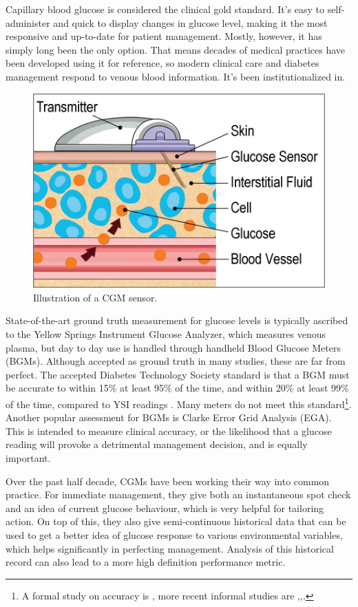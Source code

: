 Capillary blood glucose is considered the clinical gold standard. It’s easy to self-administer and quick to display changes in glucose level, making it the most responsive and up-to-date for patient management. Mostly, however, it has simply long been the only option. That means decades of medical practices have been developed using it for reference, so modern clinical care and diabetes management respond to venous blood information. It’s been institutionalized in. 

\begin{figure}[ht]
\centering\includegraphics[width=0.5\linewidth]{images/cgm.png}
\caption{Illustration of a CGM sensor.}
\label{fig:cgmsensor}
\end{figure}

State-of-the-art ground truth measurement for glucose levels is typically ascribed to the Yellow Springs Instrument Glucose Analyzer, which measures venous plasma, but day to day use is handled through handheld Blood Glucose Meters (BGMs). Although accepted as ground truth in many studies, these are far from perfect. The accepted Diabetes Technology Society standard is that a BGM must be accurate to within 15\% at least 95\% of the time, and within 20\% at least 99\% of the time, compared to YSI readings \cite{noauthor_fda_2016}. Many meters do not meet this standard\footnote{A formal study on accuracy is \cite{clarke_evaluating_1987}, more recent informal studies are \cite{scheiner_2016_nodate},\cite{noauthor_are_2017},\cite{edelman_blood_2013}.}. Another popular assessment for BGMs is Clarke Error Grid Analysis (EGA). This is intended to measure clinical accuracy, or the likelihood that a glucose reading will provoke a detrimental management decision, and is equally important.

Over the past half decade, CGMs have been working their way into common practice. For immediate management, they give both an instantaneous spot check and an idea of current glucose behaviour, which is very helpful for tailoring action. On top of this, they also give semi-continuous historical data that can be used to get a better idea of glucose response to various environmental variables, which helps significantly in perfecting management. Analysis of this historical record can also lead to a more high definition performance metric.


